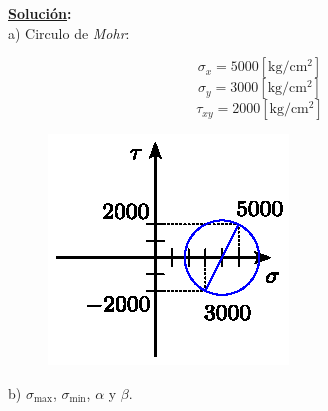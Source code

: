 \documentclass[letter,10pt,twoside]{article}
\begin{document}
\textbf{\underline{Solución}:} \\

a) Circulo de \emph{Mohr}:

\begin{equation*}
    \sigma_x = 5000[\text{kg}/\text{cm}^2]
\end{equation*}
\begin{equation*}
    \sigma_y = 3000[\text{kg}/\text{cm}^2]
\end{equation*}
\begin{equation*}
    \tau_{xy} = 2000[\text{kg}/\text{cm}^2]
\end{equation*}

\begin{figure}[H]
\centering
\includegraphics[scale=1.2]{resources/f11.eps}
\end{figure}

b) $\sigma_{\text{max}}$, $\sigma_{\text{min}}$, $\alpha$ y $\beta$.
\end{document}
